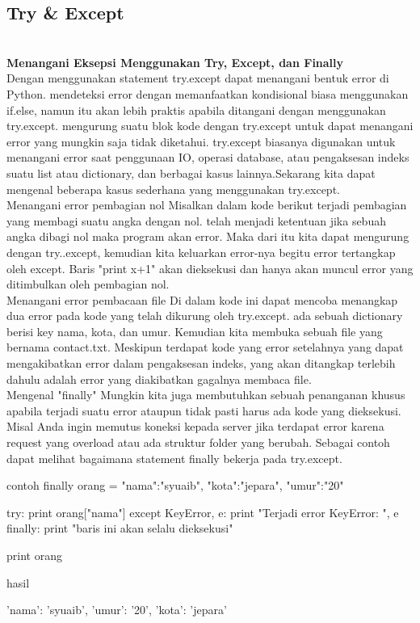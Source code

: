 \documentclass{article}
\begin{document}
\subsection{Try & Except}\\
\textbf{Menangani Eksepsi Menggunakan Try, Except, dan Finally}\\

Dengan menggunakan statement try.except dapat menangani bentuk error di Python. mendeteksi error dengan memanfaatkan kondisional biasa menggunakan if.else, namun itu akan lebih praktis apabila ditangani dengan menggunakan try.except. mengurung suatu blok kode dengan try.except untuk dapat menangani error yang mungkin saja tidak diketahui. try.except biasanya digunakan untuk menangani error saat penggunaan IO, operasi database, atau pengaksesan indeks suatu list atau dictionary, dan berbagai kasus lainnya.Sekarang kita dapat mengenal beberapa kasus sederhana yang menggunakan try.except.\\

Menangani error pembagian nol
Misalkan dalam kode berikut terjadi pembagian yang membagi suatu angka dengan nol. telah menjadi ketentuan jika sebuah angka dibagi nol maka program akan error. Maka dari itu kita dapat mengurung dengan try..except, kemudian kita keluarkan error-nya begitu error tertangkap oleh except. Baris "print x+1" akan dieksekusi dan hanya akan muncul error yang ditimbulkan oleh pembagian nol.
 \\

Menangani error pembacaan file
Di dalam kode ini dapat mencoba menangkap dua error pada kode yang telah dikurung oleh try.except. ada sebuah dictionary  berisi key nama, kota, dan umur. Kemudian kita membuka sebuah file yang bernama contact.txt. Meskipun terdapat kode yang error setelahnya yang dapat mengakibatkan error dalam pengaksesan indeks, yang akan ditangkap terlebih dahulu adalah error yang diakibatkan gagalnya membaca file.\\

Mengenal "finally"
Mungkin kita juga membutuhkan sebuah penanganan khusus apabila terjadi suatu error ataupun tidak pasti harus ada kode yang dieksekusi. Misal Anda ingin memutus koneksi kepada server jika terdapat error karena request yang overload atau ada struktur folder yang berubah. Sebagai contoh dapat melihat bagaimana statement finally bekerja pada try.except. 

contoh finally
orang = {"nama":"syuaib", "kota":"jepara", "umur":"20"}

try:
    print orang["nama"]
except KeyError, e:
    print "Terjadi error KeyError: ", e
finally:
    print "baris ini akan selalu dieksekusi"    

print orang

hasil

{'nama': 'syuaib', 'umur': '20', 'kota': 'jepara'}
\end{document}
